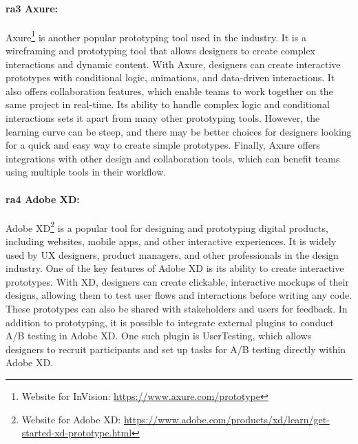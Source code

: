 \paragraph{\ac{ra}3 Axure:}
Axure\footnote{Website for InVision: \url{https://www.axure.com/prototype}} is another popular prototyping tool used in the industry. 
It is a wireframing and prototyping tool that allows designers to create complex interactions and dynamic content. 
With Axure, designers can create interactive prototypes with conditional logic, animations, and data-driven interactions. 
It also offers collaboration features, which enable teams to work together on the same project in real-time.
Its ability to handle complex logic and conditional interactions sets it apart from many other prototyping tools. 
However, the learning curve can be steep, and there may be better choices for designers looking for a quick and easy way to create simple prototypes.
Finally, Axure offers integrations with other design and collaboration tools, which can benefit teams using multiple tools in their workflow.

\paragraph{\ac{ra}4 Adobe XD:}
Adobe XD\footnote{Website for Adobe XD: \url{https://www.adobe.com/products/xd/learn/get-started-xd-prototype.html}} is a popular tool for designing and prototyping digital products, including websites, mobile apps, and other interactive experiences. 
It is widely used by UX designers, product managers, and other professionals in the design industry. 
One of the key features of Adobe XD is its ability to create interactive prototypes. 
With XD, designers can create clickable, interactive mockups of their designs, allowing them to test user flows and interactions before writing any code. 
These prototypes can also be shared with stakeholders and users for feedback.
In addition to prototyping, it is possible to integrate external plugins to conduct A/B testing in Adobe XD. 
One such plugin is UserTesting, which allows designers to recruit participants and set up tasks for A/B testing directly within Adobe XD. 

